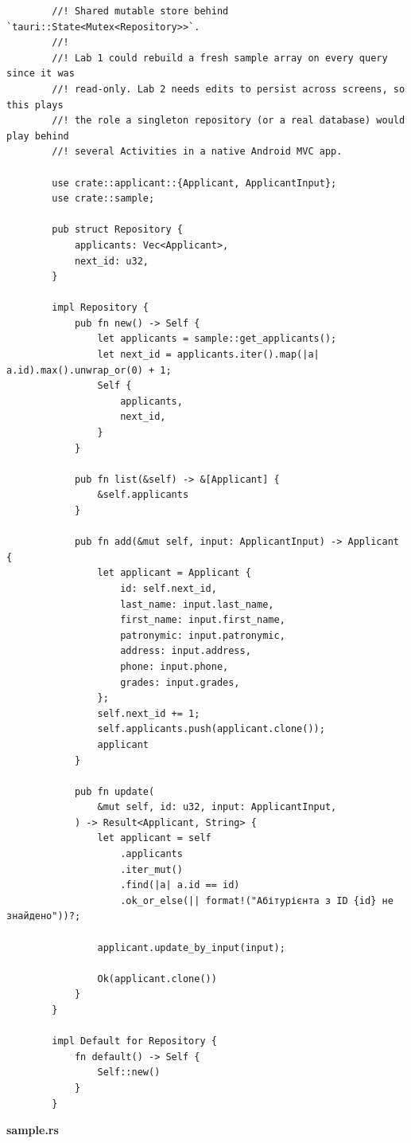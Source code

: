 \documentclass[14pt, a4paper]{extreport}
\begin{document}
	\begin{verbatim}
		//! Shared mutable store behind `tauri::State<Mutex<Repository>>`.
		//!
		//! Lab 1 could rebuild a fresh sample array on every query since it was
		//! read-only. Lab 2 needs edits to persist across screens, so this plays
		//! the role a singleton repository (or a real database) would play behind
		//! several Activities in a native Android MVC app.

		use crate::applicant::{Applicant, ApplicantInput};
		use crate::sample;

		pub struct Repository {
			applicants: Vec<Applicant>,
			next_id: u32,
		}

		impl Repository {
			pub fn new() -> Self {
				let applicants = sample::get_applicants();
				let next_id = applicants.iter().map(|a| a.id).max().unwrap_or(0) + 1;
				Self {
					applicants,
					next_id,
				}
			}

			pub fn list(&self) -> &[Applicant] {
				&self.applicants
			}

			pub fn add(&mut self, input: ApplicantInput) -> Applicant {
				let applicant = Applicant {
					id: self.next_id,
					last_name: input.last_name,
					first_name: input.first_name,
					patronymic: input.patronymic,
					address: input.address,
					phone: input.phone,
					grades: input.grades,
				};
				self.next_id += 1;
				self.applicants.push(applicant.clone());
				applicant
			}

			pub fn update(
				&mut self, id: u32, input: ApplicantInput,
			) -> Result<Applicant, String> {
				let applicant = self
					.applicants
					.iter_mut()
					.find(|a| a.id == id)
					.ok_or_else(|| format!("Абітурієнта з ID {id} не знайдено"))?;

				applicant.update_by_input(input);

				Ok(applicant.clone())
			}
		}

		impl Default for Repository {
			fn default() -> Self {
				Self::new()
			}
		}
	\end{verbatim}

	\textbf{sample.rs}
\end{document}

